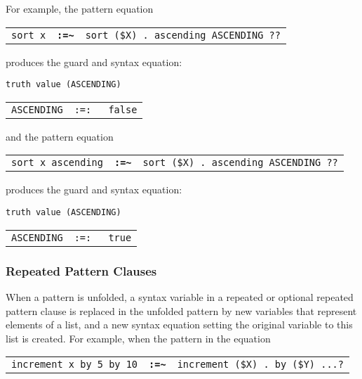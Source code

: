 \documentclass[12pt]{article}
\newcommand{\TT}[1]{{\tt \bfseries #1}}
\newcommand{\TILDE}{\textasciitilde}
\begin{document}
For example, the pattern equation

\begin{center}
\begin{tabular}{rcl}
\verb/sort x/ & \TT{:=\TILDE} & \verb/sort ($X) . ascending ASCENDING ??/ \\
\end{tabular}
\end{center}

produces the guard and syntax equation:

\begin{center}
\verb/truth value (ASCENDING)/ \\
\begin{tabular}{rcl}
\verb/ASCENDING/ & \tt :=: & \verb/false/ \\
\end{tabular}
\end{center}

and the pattern equation

\begin{center}
\begin{tabular}{rcl}
\verb/sort x ascending/ & \TT{:=\TILDE} &
	\verb/sort ($X) . ascending ASCENDING ??/ \\
\end{tabular}
\end{center}

produces the guard and syntax equation:

\begin{center}
\verb/truth value (ASCENDING)/ \\
\begin{tabular}{rcl}
\verb/ASCENDING/ & \tt :=: & \verb/true/ \\
\end{tabular}
\end{center}



\subsubsection{Repeated Pattern Clauses}
\label{REPEATED-PATTERN-CLAUSES}

When a pattern is unfolded, a syntax variable in a
repeated or optional repeated pattern clause is replaced
in the unfolded pattern by new variables that represent elements of a list,
and a new syntax equation setting the original variable to this list
is created.  For example, when the pattern in the equation

\begin{center}
\begin{tabular}{rcl}
\verb/increment x by 5 by 10/ & \TT{:=\TILDE}
			      & \verb/increment ($X) . by ($Y) ...?/ \\
\end{tabular}
\end{center}
\end{document}
